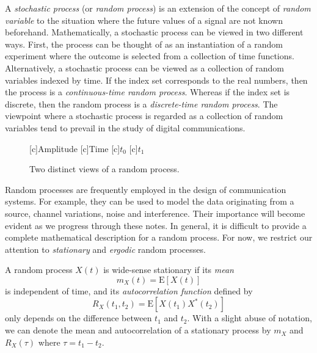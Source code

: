 A \emph{stochastic process} (or \emph{random process}) is an extension of the concept of \emph{random variable} to the situation where the future values of a signal are not known beforehand.
Mathematically, a stochastic process can be viewed in two different ways.
First, the process can be thought of as an instantiation of a random experiment where the outcome is selected from a collection of time functions.
Alternatively, a stochastic process can be viewed as a collection of random variables indexed by time.
If the index set corresponds to the real numbers, then the process is a \emph{continuous-time random process}.
Whereas if the index set is discrete, then the random process is a \emph{discrete-time random process}.
The viewpoint where a stochastic process is regarded as a collection of random variables tend to prevail in the study of digital communications.
\begin{figure}[htbp]
\begin{center}
\begin{psfrags}
[c]{Amplitude}
[c]{Time}
[c]{$t_0$}
[c]{$t_1$}
\end{psfrags}
\caption{Two distinct views of a random process.}
\label{figure:RandomProcess}
\end{center}
\end{figure}

Random processes are frequently employed in the design of communication systems.
For example, they can be used to model the data originating from a source, channel variations, noise and interference.
Their importance will become evident as we progress through these notes.
In general, it is difficult to provide a complete mathematical description for a random process.
For now, we restrict our attention to \emph{stationary} and \emph{ergodic} random processes.

\begin{definition}[Stationarity]
A random process $X(t)$ is wide-sense stationary if its \emph{mean}
\begin{equation*}
m_X(t) = \mathrm{E} [X(t)]
\end{equation*}
is independent of time, and its \emph{autocorrelation function} defined by
\begin{equation*}
R_X(t_1, t_2) = \mathrm{E} [X(t_1) X^*(t_2)]
\end{equation*}
only depends on the difference between $t_1$ and $t_2$.
With a slight abuse of notation, we can denote the mean and autocorrelation of a stationary process by $m_X$ and $R_X(\tau)$ where $\tau = t_1 - t_2$.
\end{definition}

